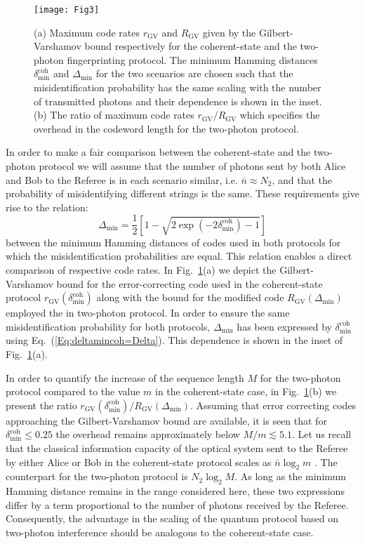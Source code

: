 \documentclass[10pt]{article}
\begin{document}
\begin{figure}[bt]
\texttt{[image: Fig3]}\centering\caption{(a) Maximum code rates $r_{\text{GV}}$  and $R_{\text{GV}}$ given by the Gilbert-Varshamov bound respectively for the coherent-state and the two-photon fingerprinting protocol. The minimum Hamming distances  $\delta_{\text{min}}^{\text{coh}}$ and $\Delta_{\text{min}}$ for the two scenarios are chosen such that the misidentification probability has the same scaling with the number of transmitted photons and their dependence is shown in the inset. (b) The ratio of maximum code rates $r_{\text{GV}}/R_{\text{GV}}$ which specifies the overhead in the codeword length for the two-photon protocol.\label{fig:GV}}
\end{figure}

In order to make a fair comparison between the coherent-state and the two-photon protocol we will assume that the number of photons sent by both Alice and Bob to the Referee is in each scenario similar, i.e. $\bar{n} \approx N_2$, and  that the probability of misidentifying different strings is the same. These requirements give rise to the relation:
\begin{equation}
\Delta_{\text{min}} = \frac{1}{2} [1-\sqrt{2\exp({-2\delta_{\text{min}}^{\text{coh}}})-1}]
\label{Eq:deltamincoh=Delta}
\end{equation}
between the minimum Hamming distances of codes used in both protocols for which the misidentification probabilities are equal. This relation enables a direct comparison of respective code rates. In Fig.~\ref{fig:GV}(a) we depict the Gilbert-Varshamov bound for the error-correcting code used in the coherent-state protocol $r_{\text{GV}}(\delta_{\text{min}}^{\text{coh}})$ along with the bound for the modified code $R_{\text{GV}}(\Delta_{\text{min}})$ employed the in two-photon protocol. In order to ensure the same misidentification probability for both protocols, $\Delta_{\text{min}}$ has been expressed by $\delta_{\text{min}}^{\text{coh}}$ using Eq.~(\ref{Eq:deltamincoh=Delta}). This dependence is shown in the inset of Fig.~\ref{fig:GV}(a).

In order to quantify the increase of the sequence length $M$ for the two-photon protocol compared to the value $m$ in the coherent-state case, in Fig.~\ref{fig:GV}(b) we present the ratio $r_{\text{GV}}(\delta_{\text{min}}^{\text{coh}})/ R_{\text{GV}}(\Delta_{\text{min}})$. Assuming that error correcting codes approaching the Gilbert-Varshamov bound are available, it is seen that for $\delta_{\text{min}}^{\text{coh}} \le 0.25$ the overhead remains approximately below $M/m  \lesssim 5.1$. Let us recall that the classical information capacity of the optical system sent to the Referee by either Alice or Bob in the coherent-state protocol scales as $\bar{n}\log_2 m$ \cite{Luthenhaus2014}. The counterpart for the two-photon protocol is $N_2 \log_2 M$. As long as the minimum Hamming distance remains in the range considered here, these two expressions differ by a term proportional to the number of photons received by the Referee. Consequently, the advantage in the scaling of the quantum protocol based on two-photon interference should be analogous to the coherent-state case.
\end{document}
